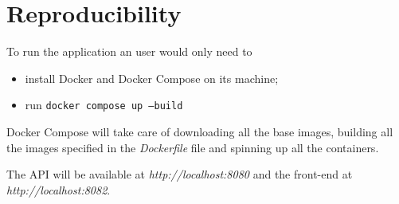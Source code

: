 \section{Reproducibility}
\label{ch:repr}

To run the application an user would only need to
\begin{itemize}
        \item install Docker and Docker Compose on its machine;
        \item run \texttt{docker compose up --build}
\end{itemize}

Docker Compose will take care of downloading all the base images,
building all the images specified in the \textit{Dockerfile} file
and spinning up all the containers.

The API will be available at \textit{http://localhost:8080} and the
front-end at \textit{http://localhost:8082}.
